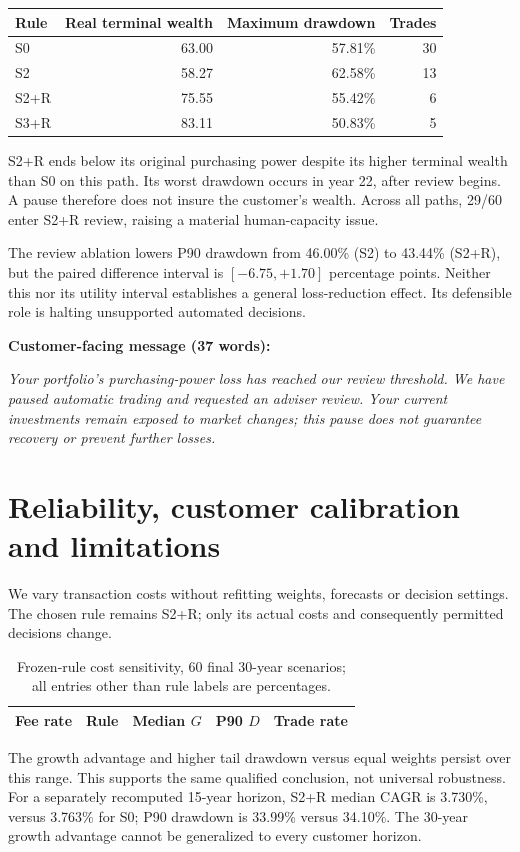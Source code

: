 \documentclass[11pt,a4paper]{article}
\begin{document}
\begin{center}\begin{tabular}{lrrr}\toprule
Rule & Real terminal wealth & Maximum drawdown & Trades\\\midrule
S0 & 63.00 & 57.81\% & 30\\
S2 & 58.27 & 62.58\% & 13\\
S2+R & 75.55 & 55.42\% & 6\\
S3+R & 83.11 & 50.83\% & 5\\\bottomrule
\end{tabular}\end{center}
S2+R ends below its original purchasing power despite its higher terminal
wealth than S0 on this path. Its worst drawdown occurs in year 22, after review
begins. A pause therefore does not insure the customer's wealth. Across all
paths, 29/60 enter S2+R review, raising a material human-capacity issue.

The review ablation lowers P90 drawdown from 46.00\% (S2) to 43.44\% (S2+R),
but the paired difference interval is $[-6.75,+1.70]$ percentage points.
Neither this nor its utility interval establishes a general loss-reduction
effect. Its defensible role is halting unsupported automated decisions.

\textbf{Customer-facing message (37 words):}\par
\emph{Your portfolio's purchasing-power loss has reached our review threshold.
We have paused automatic trading and requested an adviser review. Your current
investments remain exposed to market changes; this pause does not guarantee
recovery or prevent further losses.}

\newpage
\section{Reliability, customer calibration and limitations}
We vary transaction costs without refitting weights, forecasts or decision
settings. The chosen rule remains S2+R; only its actual costs and consequently
permitted decisions change.
\begin{table}[H]\centering
\caption{Frozen-rule cost sensitivity, 60 final 30-year scenarios; all entries
other than rule labels are percentages.}
\begin{tabular}{rlrrr}\toprule
Fee rate & Rule & Median $G$ & P90 $D$ & Trade rate\\\midrule

\bottomrule\end{tabular}
\end{table}
The growth advantage and higher tail drawdown versus equal weights persist
over this range. This supports the same qualified conclusion, not universal
robustness. For a separately recomputed 15-year horizon, S2+R median CAGR is
3.730\%, versus 3.763\% for S0; P90 drawdown is 33.99\% versus 34.10\%.
The 30-year growth advantage cannot be generalized to every customer horizon.
\end{document}
